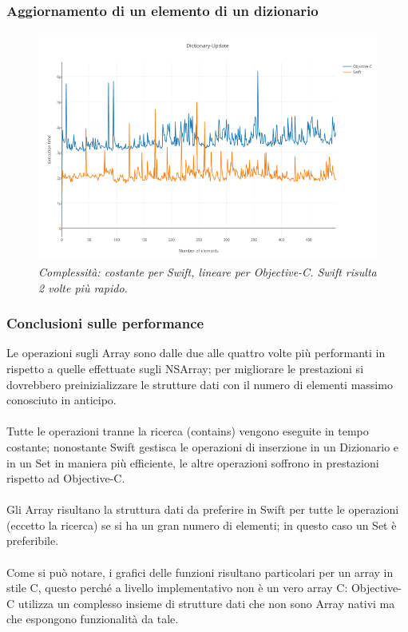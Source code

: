 \subsubsection{Aggiornamento di un elemento di un dizionario}
\begin{figure}[H]
      \centering
      \includegraphics[scale=0.50]{immagini/dictionary_update.png}
            \vspace{0.8cm}
            \caption{\textit{Complessità: costante per Swift, lineare per Objective-C. Swift risulta 2 volte più rapido.}}
\end{figure}
\subsubsection{Conclusioni sulle performance}
Le operazioni sugli Array sono dalle due alle quattro volte più performanti in rispetto a quelle effettuate sugli NSArray; per migliorare le prestazioni si dovrebbero preinizializzare le strutture dati con il numero di elementi massimo conosciuto in anticipo.\\\\Tutte le operazioni tranne la ricerca (contains) vengono eseguite in tempo costante; nonostante Swift gestisca le operazioni di inserzione in un Dizionario e in un Set in maniera più efficiente, le altre operazioni soffrono in prestazioni rispetto ad Objective-C.\\
\\Gli Array risultano la struttura dati da preferire in Swift per tutte le operazioni (eccetto la ricerca) se si ha un gran numero di elementi; in questo caso un Set è preferibile.\\\\
Come si può notare, i grafici delle funzioni risultano particolari per un array in stile C, questo perché a livello implementativo non è un vero array C: Objective-C utilizza un complesso insieme di strutture dati che non sono Array nativi ma che espongono funzionalità da tale.
    
    
    
    



